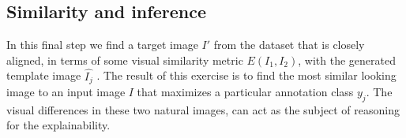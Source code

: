 \subsection{Similarity and inference}
In this final step we find a target image $I'$ from the dataset that is closely aligned, in terms of some visual similarity metric $E(I_1, I_2)$, with the generated template image  $\hat{I_j}$ . The result of this exercise is to find the most similar looking image to an input image $I$ that maximizes a particular annotation class $y_j$.%
The visual differences in these two natural images, can act as the subject of reasoning for the explainability.